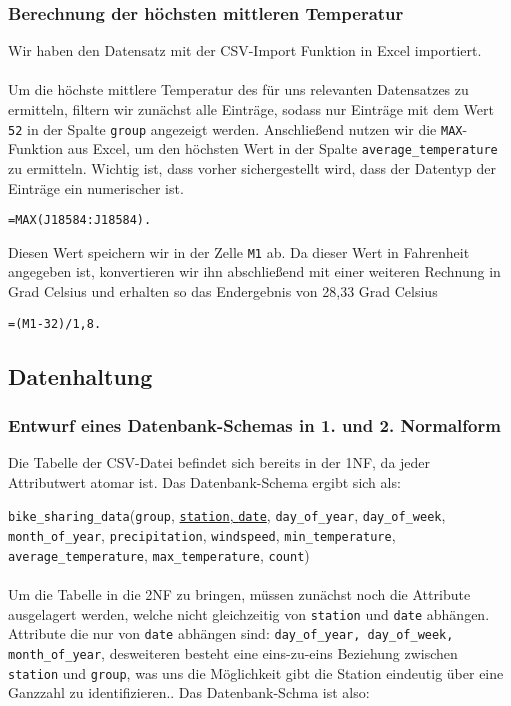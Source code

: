 \documentclass{article}
\begin{document}
\subsubsection{Berechnung der höchsten mittleren Temperatur}
Wir haben den Datensatz mit der CSV-Import Funktion in Excel importiert.\\\\
Um die höchste mittlere Temperatur des für uns relevanten Datensatzes zu ermitteln, filtern wir zunächst alle Einträge, sodass nur Einträge mit dem Wert \texttt{52} in der Spalte \texttt{group} angezeigt werden. Anschließend nutzen wir die \texttt{MAX}-Funktion aus Excel, um den höchsten Wert in der Spalte \texttt{average\_temperature} zu ermitteln. Wichtig ist, dass vorher sichergestellt wird, dass der Datentyp der Einträge ein numerischer ist.
\begin{lstlisting}
=MAX(J18584:J18584).
\end{lstlisting}
Diesen Wert speichern wir in der Zelle \texttt{M1} ab. Da dieser Wert in Fahrenheit angegeben ist, konvertieren wir ihn abschließend mit einer weiteren Rechnung in Grad Celsius und erhalten so das Endergebnis von 28,33 Grad Celsius
\begin{lstlisting}
=(M1-32)/1,8.
\end{lstlisting}
 
\subsection{Datenhaltung}
\subsubsection{Entwurf eines Datenbank-Schemas in 1. und 2. Normalform}

Die Tabelle der CSV-Datei befindet sich bereits in der 1NF, da jeder Attributwert atomar ist. Das Datenbank-Schema ergibt sich als: 

\texttt{bike\_sharing\_data}(\texttt{group}, \underline{\texttt{station}, \texttt{date}}, \texttt{day\_of\_year}, \texttt{day\_of\_week}, \texttt{month\_of\_year}, \texttt{precipitation}, \texttt{windspeed}, \texttt{min\_temperature}, \texttt{average\_temperature}, \texttt{max\_temperature}, \texttt{count})
\\\\
Um die Tabelle in die 2NF zu bringen, müssen zunächst noch die Attribute ausgelagert werden, welche nicht gleichzeitig von \texttt{station} und \texttt{date} abhängen. Attribute die nur von \texttt{date} abhängen sind: \texttt{day\_of\_year, day\_of\_week, month\_of\_year}, desweiteren besteht eine eins-zu-eins Beziehung zwischen \texttt{station} und \texttt{group}, was uns die Möglichkeit gibt die Station eindeutig über eine Ganzzahl zu identifizieren.. Das Datenbank-Schma ist also:
\end{document}
